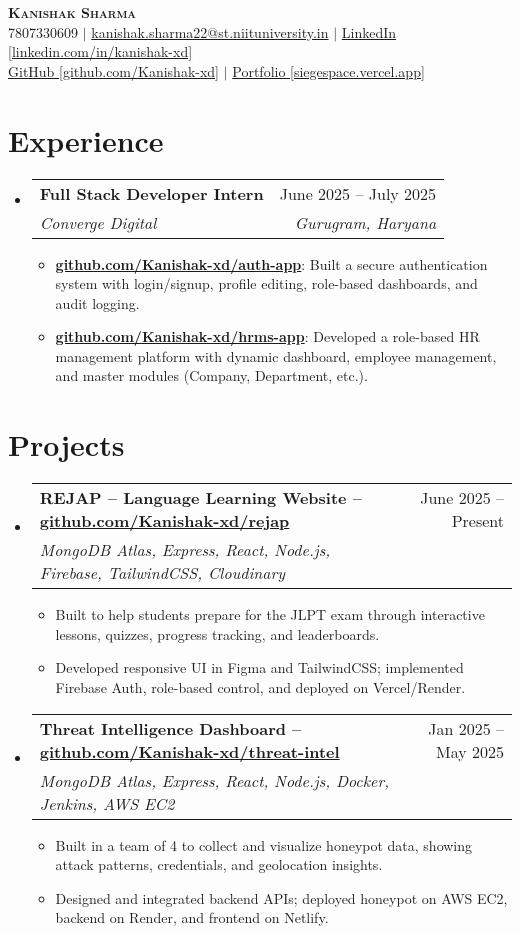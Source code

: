 \documentclass[letterpaper,11pt]{article}
\makeatletter
\newcommand{\resumeItem}[1]{
  \item\small{
    {#1 \vspace{-2pt}}
  }
}
\newcommand{\resumeSubheading}[4]{
  \vspace{-2pt}\item
    \begin{tabular*}{0.97\textwidth}[t]{l@{\extracolsep{\fill}}r}
      \textbf{#1} & #2 \\
      \textit{\small#3} & \textit{\small #4} \\
    \end{tabular*}\vspace{-7pt}
}
\newcommand{\resumeItemListStart}{\begin{itemize}}
\newcommand{\resumeItemListEnd}{\end{itemize}\vspace{-5pt}}
\newcommand{\resumeSubHeadingListStart}{\begin{itemize}[leftmargin=0.15in, label={}]}
\newcommand{\resumeSubHeadingListEnd}{\end{itemize}}
\makeatother
\begin{document}
\begin{center}
    \textbf{\Huge \scshape Kanishak Sharma} \\ \vspace{1pt}
    \small 7807330609 $|$ \href{https://mail.google.com/mail/?view=cm&fs=1&to=kanishak.sharma22@st.niituniversity.in&su=&body=}{kanishak.sharma22@st.niituniversity.in} $|$
    \href{https://www.linkedin.com/in/kanishak-xd}{LinkedIn [linkedin.com/in/kanishak-xd]} \\
    \href{https://github.com/Kanishak-xd}{GitHub [github.com/Kanishak-xd]} $|$
    \href{https://siegespace.vercel.app}{Portfolio [siegespace.vercel.app]}
\end{center}


\section{Experience}
\resumeSubHeadingListStart
  \resumeSubheading
    {Full Stack Developer Intern}{June 2025 -- July 2025}
    {Converge Digital}{Gurugram, Haryana}
  \resumeItemListStart
    \resumeItem{\textbf{\href{https://github.com/Kanishak-xd/auth-app}{github.com/Kanishak-xd/auth-app}}: Built a secure authentication system with login/signup, profile editing, role-based dashboards, and audit logging.}
    \resumeItem{\textbf{\href{https://github.com/Kanishak-xd/hrms-app}{github.com/Kanishak-xd/hrms-app}}: Developed a role-based HR management platform with dynamic dashboard, employee management, and master modules (Company, Department, etc.).}
  \resumeItemListEnd
\resumeSubHeadingListEnd

\section{Projects}
\resumeSubHeadingListStart
  \resumeSubheading
    {REJAP -- Language Learning Website -- \href{https://github.com/Kanishak-xd/rejap}{github.com/Kanishak-xd/rejap}}{June 2025 -- Present}
    {MongoDB Atlas, Express, React, Node.js, Firebase, TailwindCSS, Cloudinary}{}
    \resumeItemListStart
      \resumeItem{Built to help students prepare for the JLPT exam through interactive lessons, quizzes, progress tracking, and leaderboards.}
      \resumeItem{Developed responsive UI in Figma and TailwindCSS; implemented Firebase Auth, role-based control, and deployed on Vercel/Render.}
    \resumeItemListEnd

  \resumeSubheading
    {Threat Intelligence Dashboard -- \href{https://github.com/Kanishak-xd/threat-intel}{github.com/Kanishak-xd/threat-intel}}{Jan 2025 -- May 2025}
    {MongoDB Atlas, Express, React, Node.js, Docker, Jenkins, AWS EC2}{}
    \resumeItemListStart
      \resumeItem{Built in a team of 4 to collect and visualize honeypot data, showing attack patterns, credentials, and geolocation insights.}
      \resumeItem{Designed and integrated backend APIs; deployed honeypot on AWS EC2, backend on Render, and frontend on Netlify.}
    \resumeItemListEnd
\resumeSubHeadingListEnd
\end{document}
